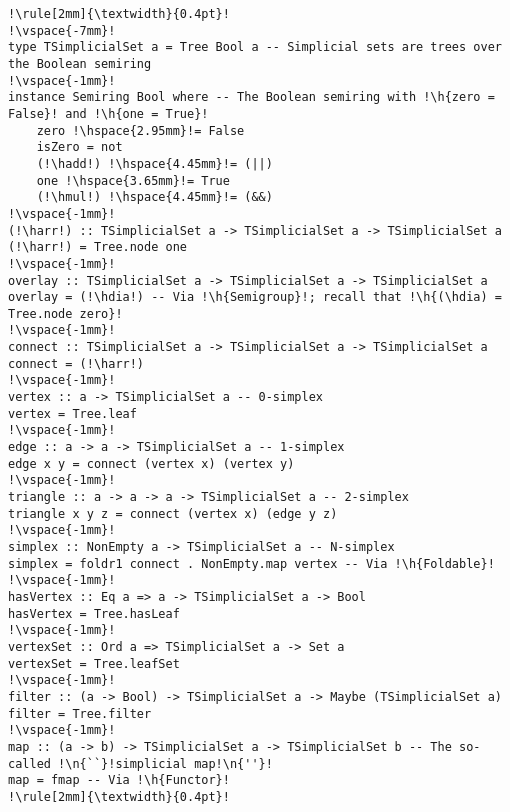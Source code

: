 \documentclass[english,submission]{programming}
\newcommand{\h}[1]{{\itshape\color{grayblue}#1}} %
\newcommand{\n}[1]{{\itshape\color{graygreen}#1}} %
\newcommand{\hadd}{{\large\color{darkblue} $\oplus$}}
\newcommand{\hmul}{{\large\color{darkblue} $\otimes$}}
\newcommand{\hdia}{\,\text{\raisebox{-0.2mm}{\Large\color{darkblue} $\diamond$}}\,}
\newcommand{\harr}{\,\text{\color{darkblue} $\rightarrow$}\,}
\begin{document}
\begin{lstlisting}[float,label=lst-simplicial-set,xleftmargin=0pt,caption={
    A basic API for working with simplicial sets represented by trees.
}]
!\rule[2mm]{\textwidth}{0.4pt}!
!\vspace{-7mm}!
type TSimplicialSet a = Tree Bool a -- Simplicial sets are trees over the Boolean semiring
!\vspace{-1mm}!
instance Semiring Bool where -- The Boolean semiring with !\h{zero = False}! and !\h{one = True}!
    zero !\hspace{2.95mm}!= False
    isZero = not
    (!\hadd!) !\hspace{4.45mm}!= (||)
    one !\hspace{3.65mm}!= True
    (!\hmul!) !\hspace{4.45mm}!= (&&)
!\vspace{-1mm}!
(!\harr!) :: TSimplicialSet a -> TSimplicialSet a -> TSimplicialSet a
(!\harr!) = Tree.node one
!\vspace{-1mm}!
overlay :: TSimplicialSet a -> TSimplicialSet a -> TSimplicialSet a
overlay = (!\hdia!) -- Via !\h{Semigroup}!; recall that !\h{(\hdia) = Tree.node zero}!
!\vspace{-1mm}!
connect :: TSimplicialSet a -> TSimplicialSet a -> TSimplicialSet a
connect = (!\harr!)
!\vspace{-1mm}!
vertex :: a -> TSimplicialSet a -- 0-simplex
vertex = Tree.leaf
!\vspace{-1mm}!
edge :: a -> a -> TSimplicialSet a -- 1-simplex
edge x y = connect (vertex x) (vertex y)
!\vspace{-1mm}!
triangle :: a -> a -> a -> TSimplicialSet a -- 2-simplex
triangle x y z = connect (vertex x) (edge y z)
!\vspace{-1mm}!
simplex :: NonEmpty a -> TSimplicialSet a -- N-simplex
simplex = foldr1 connect . NonEmpty.map vertex -- Via !\h{Foldable}!
!\vspace{-1mm}!
hasVertex :: Eq a => a -> TSimplicialSet a -> Bool
hasVertex = Tree.hasLeaf
!\vspace{-1mm}!
vertexSet :: Ord a => TSimplicialSet a -> Set a
vertexSet = Tree.leafSet
!\vspace{-1mm}!
filter :: (a -> Bool) -> TSimplicialSet a -> Maybe (TSimplicialSet a)
filter = Tree.filter
!\vspace{-1mm}!
map :: (a -> b) -> TSimplicialSet a -> TSimplicialSet b -- The so-called !\n{``}!simplicial map!\n{''}!
map = fmap -- Via !\h{Functor}!
!\rule[2mm]{\textwidth}{0.4pt}!
\end{lstlisting}
\end{document}
